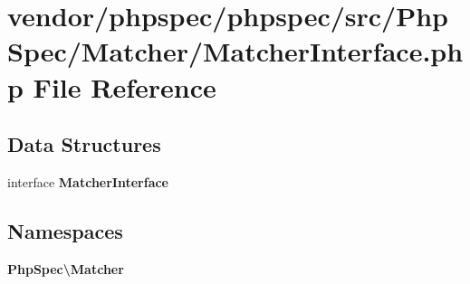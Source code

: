 \section{vendor/phpspec/phpspec/src/\+Php\+Spec/\+Matcher/\+Matcher\+Interface.php File Reference}
\label{_matcher_interface_8php}
\subsection*{Data Structures}
\begin{DoxyCompactItemize}
\item 
interface {\bf Matcher\+Interface}
\end{DoxyCompactItemize}
\subsection*{Namespaces}
\begin{DoxyCompactItemize}
\item 
 {\bf Php\+Spec\textbackslash{}\+Matcher}
\end{DoxyCompactItemize}
